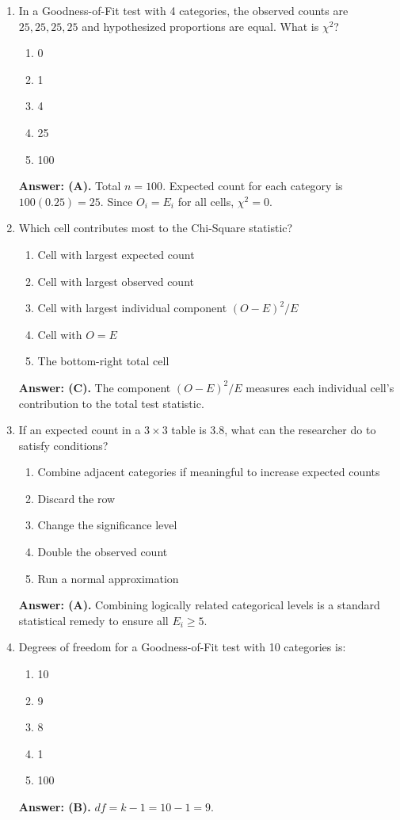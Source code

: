 \begin{enumerate}[leftmargin=1.5em]
  \item In a Goodness-of-Fit test with 4 categories, the observed counts are $25, 25, 25, 25$ and hypothesized proportions are equal. What is $\chi^2$?
  \begin{enumerate}[label=(\Alph*)]
    \item 0 \item 1 \item 4 \item 25 \item 100
  \end{enumerate}
  \textbf{Answer: (A).} Total $n = 100$. Expected count for each category is $100(0.25) = 25$. Since $O_i = E_i$ for all cells, $\chi^2 = 0$.

  \item Which cell contributes most to the Chi-Square statistic?
  \begin{enumerate}[label=(\Alph*)]
    \item Cell with largest expected count \item Cell with largest observed count \item Cell with largest individual component $(O - E)^2 / E$ \item Cell with $O = E$ \item The bottom-right total cell
  \end{enumerate}
  \textbf{Answer: (C).} The component $(O - E)^2 / E$ measures each individual cell's contribution to the total test statistic.

  \item If an expected count in a $3 \times 3$ table is 3.8, what can the researcher do to satisfy conditions?
  \begin{enumerate}[label=(\Alph*)]
    \item Combine adjacent categories if meaningful to increase expected counts \item Discard the row \item Change the significance level \item Double the observed count \item Run a normal approximation
  \end{enumerate}
  \textbf{Answer: (A).} Combining logically related categorical levels is a standard statistical remedy to ensure all $E_i \ge 5$.

  \item Degrees of freedom for a Goodness-of-Fit test with 10 categories is:
  \begin{enumerate}[label=(\Alph*)]
    \item 10 \item 9 \item 8 \item 1 \item 100
  \end{enumerate}
  \textbf{Answer: (B).} $df = k - 1 = 10 - 1 = 9$.


\end{enumerate}
